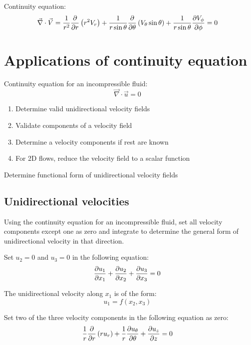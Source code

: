 Continuity equation:
$$ \vec{\nabla} \cdot \vec{V} = {1 \over r^2} {\partial \over \partial r} \left( r^2 V_r \right) + {1 \over r \sin\theta} {\partial \over \partial \theta} \left( V_\theta \sin\theta \right) + {1 \over r \sin\theta} {\partial V_\phi \over \partial \phi} = 0 $$



\section{Applications of continuity equation}
Continuity equation for an incompressible fluid:
$$ \vec{\nabla} \cdot \vec{u} = 0 $$
\begin{enumerate}
\item Determine valid unidirectional velocity fields
\item Validate components of a velocity field
\item Determine a velocity components if rest are known
\item For 2D flows, reduce the velocity field to a scalar function
\end{enumerate}


\begin {lo3} 
Determine functional form of unidirectional velocity fields
\end {lo3}

\subsection{Unidirectional velocities}

Using the continuity equation for an incompressible fluid, set all velocity components except one as zero and integrate to determine the general form of unidirectional velocity in that direction.

Set $u_2=0$ and $u_3=0$ in the following equation:
$$ {\partial u_1 \over \partial x_1} + {\partial u_2 \over \partial x_2} + {\partial u_3 \over \partial x_3} = 0 $$

The unidirectional velocity along $x_1$ is of the form:
	$$ u_1 = f\left(x_2, x_3 \right) $$

Set two of the three velocity components in the following equation as zero:
$$ {1 \over r} {\partial \over \partial r} \left( r u_r \right) + {1 \over r} {\partial u_\theta \over \partial \theta} + {\partial u_z \over \partial z} = 0 $$


